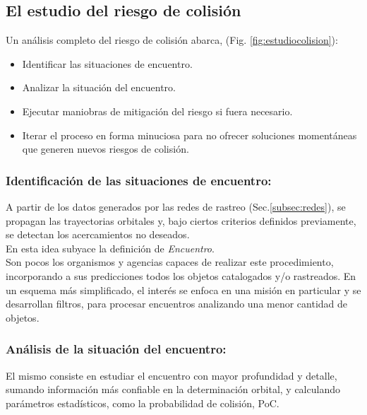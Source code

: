 \subsection{El estudio del riesgo de colisi\'on}\label{subsec:estudiocolision}

Un an\'alisis completo del riesgo de colisi\'on abarca, (Fig. \ref{fig:estudiocolision}):

\begin{itemize}
\setlength{\itemsep}{0pt}
\item Identificar las situaciones de encuentro.
\item Analizar la situaci\'on del encuentro.
\item Ejecutar maniobras de mitigaci\'on del riesgo si fuera necesario.
\item Iterar el proceso en forma minuciosa para no ofrecer soluciones moment\'aneas que generen nuevos riesgos de colisi\'on.
\end{itemize}

\subsubsection*{Identificaci\'on de las situaciones de encuentro:}
A partir de los datos generados por las redes de rastreo (Sec.\ref{subsec:redes}), se propagan las trayectorias orbitales y, bajo ciertos criterios definidos previamente, se detectan los acercamientos no deseados.\\
En esta idea subyace la definici\'on de {\it{Encuentro}}.\\

Son pocos los organismos y agencias capaces de realizar este procedimiento, incorporando a sus predicciones todos los objetos catalogados y/o rastreados. En un esquema m\'as simplificado, el inter\'es se enfoca en una misi\'on en particular y se desarrollan filtros, para procesar encuentros analizando una menor cantidad de objetos.\\


\subsubsection*{An\'alisis de la situaci\'on del encuentro: }
El mismo consiste en estudiar el encuentro con mayor profundidad y detalle, sumando informaci\'on m\'as confiable en la determinaci\'on orbital, y calculando par\'ametros estad\'isticos, como la probabilidad de colisi\'on, \ac{PoC}.\\

